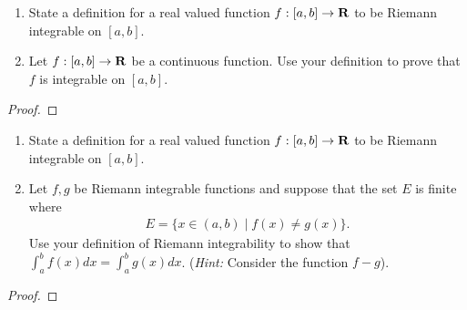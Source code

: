 \documentclass[11pt,twoside,openany]{memoir}
\begin{document}
\newpage
\fancyhead[L]{\scalebox{0.9}{Integration}}
\fancyhead[R]{\scalebox{0.9}{Appeared on: S15}}
\begin{problem}
    \phantom{a}
    \begin{enumerate}[label = (\arabic*)]
        \item State a definition for a real valued function $f:[a,b] \rightarrow \mathbf{R}$ to be Riemann integrable on $[a,b]$.
        \item Let $f:[a,b] \rightarrow \mathbf{R}$ be a continuous function. Use your definition to prove that $f$ is integrable on $[a,b]$.
    \end{enumerate}
\end{problem}
\begin{proof}
\end{proof}

\newpage
\fancyhead[L]{\scalebox{0.9}{Integration}}
\fancyhead[R]{\scalebox{0.9}{Appeared on: S14}}
\begin{problem}
    \phantom{a}
    \begin{enumerate}[label = (\arabic*)]
        \item State a definition for a real valued function $f:[a,b] \rightarrow \mathbf{R}$ to be Riemann integrable on $[a,b]$.
        \item Let $f,g$ be Riemann integrable functions and suppose that the set $E$ is finite where 
            \begin{equation*}
            \begin{split}
                E = \{x \in (a,b) \mid f(x) \neq g(x) \}.
            \end{split}
            \end{equation*}
        Use your definition of Riemann integrability to show that $\int_a^b f(x)dx = \int_a^b g(x)dx$. (\textit{Hint:} Consider the function $f-g$).
    \end{enumerate}
\end{problem}
\begin{proof}
\end{proof}
\end{document}

